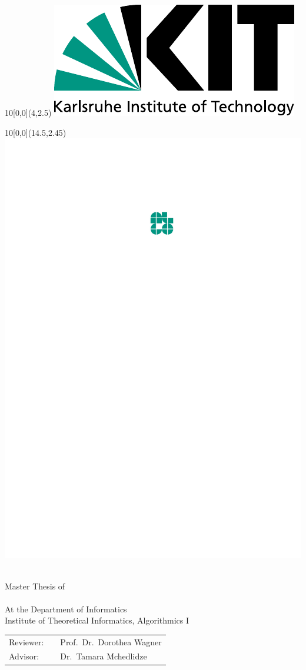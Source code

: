 \makeatletter
\begin{titlepage}


\begin{textblock}{10}[0,0](4,2.5)
\includegraphics[width=.3\textwidth]{Resources/Logos/KIT.pdf}
\end{textblock}

\begin{textblock}{10}[0,0](14.5,2.45)
\includegraphics[width=.15\textwidth]{Resources/Logos/Algo.pdf}
\end{textblock}


\vspace*{3.75cm}

\begin{center}
  \Huge{\@title}
  \vspace*{2.25cm}\\
  \Large{Master Thesis of}\\
  \vspace*{1cm}
  \huge{\@author}\\
  \vspace*{1cm}
  \Large{At the Department of Informatics}\\
  \Large{Institute of Theoretical Informatics, Algorithmics I}\\
\end{center}

\vspace*{1cm}

\begin{center}
\begin{Large}
\begin{tabular}[ht]{l c l}
  Reviewer: & \hfill & Prof.~Dr.~Dorothea Wagner\\
  Advisor: & \hfill & Dr.~Tamara Mchedlidze
\end{tabular}
\end{Large}
\end{center}


\end{titlepage}
